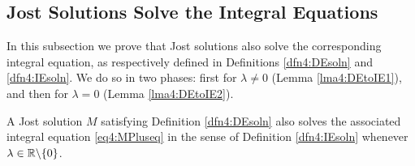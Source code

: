\documentclass[../dissertation.tex]{subfiles}
\begin{document}
\subsection{Jost Solutions Solve the Integral Equations}\label{subsec4:DEtoIE}

In this subsection we prove that Jost solutions also solve the 
corresponding integral equation, as respectively 
defined in Definitions \ref{dfn4:DEsoln} and \ref{dfn4:IEsoln}. We do 
so in two phases: first for $\lambda \ne 0$ (Lemma \ref{lma4:DEtoIE1}), and then 
for $\lambda = 0$ (Lemma \ref{lma4:DEtoIE2}). 

\begin{lma}\label{lma4:DEtoIE1}
	A Jost solution $M$ satisfying Definition \ref{dfn4:DEsoln} also solves the 
	associated integral equation \ref{eq4:MPluseq} in the sense of Definition 
	\ref{dfn4:IEsoln} whenever $\lambda \in \mathbb R \backslash \{0\}$.
\end{lma}
\end{document}
